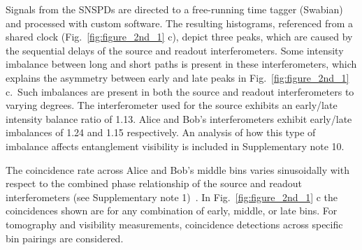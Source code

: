 \documentclass[11pt]{caltech_thesis} %
\begin{document}
Signals from the SNSPDs are directed to a free-running time tagger (Swabian) and processed with custom software. The resulting histograms, referenced from a shared clock (Fig.~\ref{fig:figure_2nd_1} c), depict three peaks, which are caused by the sequential delays of the source and readout interferometers. Some intensity imbalance between long and short paths is present in these interferometers, which explains the asymmetry between early and late peaks in Fig.~\ref{fig:figure_2nd_1} c.~Such imbalances are present in both the source and readout interferometers to varying degrees. The interferometer used for the source exhibits an early/late intensity balance ratio of 1.13. Alice and Bob's interferometers exhibit early/late imbalances of 1.24 and 1.15 respectively. An analysis of how this type of imbalance affects entanglement visibility is included in Supplementary note 10.

The coincidence rate across Alice and Bob's middle bins varies sinusoidally with respect to the combined phase relationship of the source and readout interferometers (see Supplementary note 1)~\autocite{Inagaki2013,Marcikic2002}. In Fig.~\ref{fig:figure_2nd_1} c the coincidences shown are for any combination of early, middle, or late bins. For tomography and visibility measurements, coincidence detections across specific bin pairings are considered.\\
\end{document}
